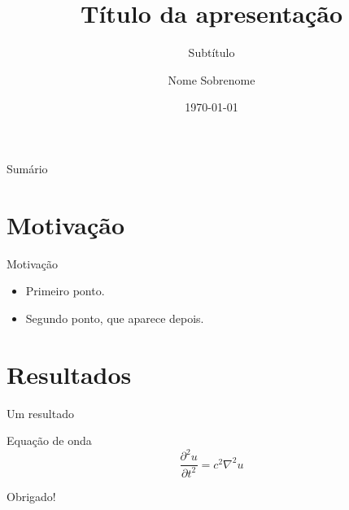 \documentclass[aspectratio=169]{beamer}
\title{Título da apresentação}
\subtitle{Subtítulo}
\author{Nome Sobrenome}
\institute{Instituição}
\date{\today}
\begin{document}
\begin{frame}
  \titlepage
\end{frame}

\begin{frame}{Sumário}
  \tableofcontents
\end{frame}

\section{Motivação}

\begin{frame}{Motivação}
  \begin{itemize}
    \item<1-> Primeiro ponto.
    \item<2-> Segundo ponto, que aparece depois.
  \end{itemize}
\end{frame}

\section{Resultados}

\begin{frame}{Um resultado}
  \begin{block}{Equação de onda}
    \[
      \frac{\partial^2 u}{\partial t^2} = c^2 \nabla^2 u
    \]
  \end{block}
\end{frame}

\begin{frame}
  \centering\Large Obrigado!
\end{frame}
\end{document}
